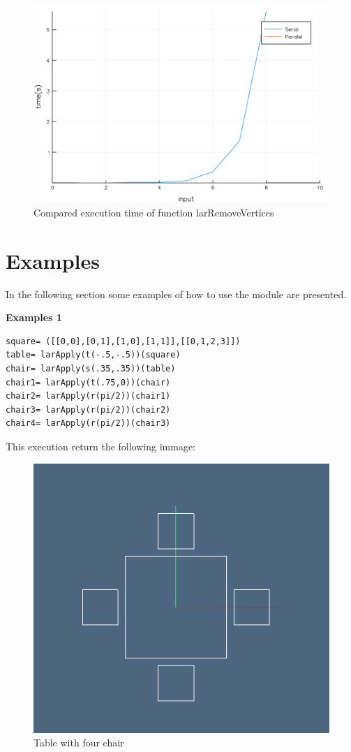 \documentclass[a4paper,12pt]{article}
\begin{document}
\begin{figure}[!h]
\centering
\includegraphics[scale=0.08]{larRemoveVerticesC.png}
\caption{Compared execution time of function larRemoveVertices}
\end{figure}

\newpage

\section{Examples}
In the following section some examples of how to use the module are presented.
\vspace{10px}

\noindent\textbf{Examples 1}
\begin{Verbatim}[fontsize=\footnotesize]
square= ([[0,0],[0,1],[1,0],[1,1]],[[0,1,2,3]])
table= larApply(t(-.5,-.5))(square)
chair= larApply(s(.35,.35))(table)
chair1= larApply(t(.75,0))(chair)
chair2= larApply(r(pi/2))(chair1)
chair3= larApply(r(pi/2))(chair2)
chair4= larApply(r(pi/2))(chair3)
\end{Verbatim}
This execution return the following immage:

\begin{figure}[!h]
\centering
\includegraphics[scale=0.6]{tablewithchairs.png}
\caption{Table with four chair}
\end{figure}
\end{document}
